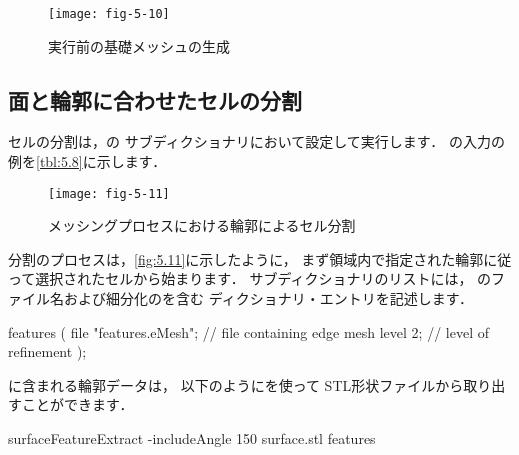 \begin{figure}[ht]
 \texttt{[image: fig-5-10]}
 \caption{実行前の基礎メッシュの生成}
 \label{fig:5.10}
\end{figure}


\subsection{面と輪郭に合わせたセルの分割}
\label{ssec:5.4.3}
%
セルの分割は，の
%
%
サブディクショナリにおいて設定して実行します．
の入力の例を\autoref{tbl:5.8}に示します．


\begin{table}[ht]
 
 \caption{の
%
%
 サブディクショナリのキーワード}
 \label{tbl:5.8}
\end{table}


\begin{figure}[ht]
 \texttt{[image: fig-5-11]}
 \caption{メッシングプロセスにおける輪郭によるセル分割}
 \label{fig:5.11}
\end{figure}


分割のプロセスは，\autoref{fig:5.11}に示したように，
まず領域内で指定された輪郭に従って選択されたセルから始まります．
サブディクショナリのリストには，
のファイル名および細分化のを含む
ディクショナリ・エントリを記述します．
\begin{OFverbatim}[file]
features
(
    {
        file "features.eMesh"; // file containing edge mesh
        level 2;               // level of refinement
    }
);
\end{OFverbatim}
に含まれる輪郭データは，
以下のようにを使って
%
%
STL形状ファイルから取り出すことができます．
\begin{OFverbatim}[terminal]
surfaceFeatureExtract -includeAngle 150 surface.stl features
\end{OFverbatim}



